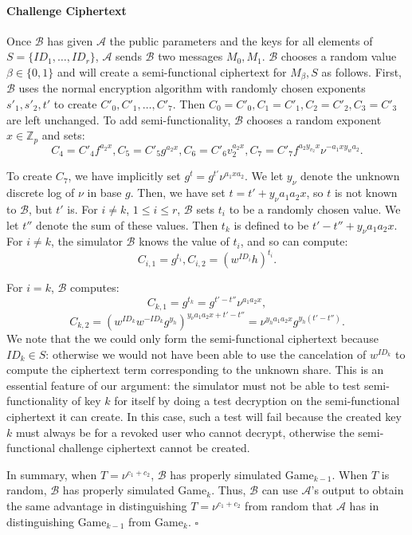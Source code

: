 \documentclass[a4paper, 11pt]{article}
\newenvironment{proof}{\par\noindent{\bf Proof.}}{$\square$\par\bigskip}
\newcommand{\Z}{\ensuremath{\mathbb{Z}}}
\theoremstyle{definition}
\begin{document}
\begin{proof}
\paragraph{Challenge Ciphertext} Once $\mathcal{B}$ has given $\mathcal{A}$ the public parameters and the keys for all elements of $S = \{ID_1, \ldots, ID_r\}$, $\mathcal{A}$ sends $\mathcal{B}$ two messages $M_0, M_1$. $\mathcal{B}$ chooses a random value $\beta \in \{0,1\}$ and will create a semi-functional ciphertext for $M_\beta, S$ as follows. First, $\mathcal{B}$ uses the normal encryption algorithm with randomly chosen exponents $s'_1, s'_2, t'$ to create $C'_0, C'_1, \ldots, C'_7$. Then $C_0 = C'_0, C_1 = C'_1, C_2 = C'_2, C_3 = C'_3$ are left unchanged. To add semi-functionality, $\mathcal{B}$ chooses a random exponent $x \in \Z_p$ and sets:
\[C_4 = C'_4 f^{a_2 x}, C_5 = C'_5 g^{a_2x}, C_6 = C'_6v_2^{a_2x}, C_7 = C'_7 f^{a_2 y_{v_2}x} \nu^{-a_1 x y_w a_2}.\]

To create $C_7$, we have implicitly set $g^{t} = g^{t'} \nu^{a_1 x a_2}$. We let $y_{\nu}$ denote the unknown discrete log of $\nu$ in base $g$. Then, we have set $t = t' + y_{\nu} a_1 a_2 x$, so $t$ is not known to $\mathcal{B}$, but $t'$ is. For $i\neq k$, $1\leq i \leq r$, $\mathcal{B}$ sets $t_i$ to be a randomly chosen value. We let $t''$ denote the sum of these values. Then $t_k$ is defined to be $t'-t'' + y_{\nu} a_1 a_2 x$. For $i\neq k$, the simulator $\mathcal{B}$ knows the value of $t_i$, and so can compute:
\[C_{i,1} = g^{t_i}, C_{i,2} = (w^{ID_i}h)^{t_i}.\]

For $i = k$, $\mathcal{B}$ computes:
\[C_{k,1} = g^{t_k} = g^{t'-t''} \nu^{a_1 a_2 x}, \]
\[C_{k,2}  = (w^{ID_k}w^{-ID_k}g^{y_h})^{y_\nu a_1 a_2 x + t' - t''} = \nu^{y_h a_1 a_2 x} g^{y_h(t' - t'')}.\]
We note that the we could only form the semi-functional ciphertext because $ID_k \in S$: otherwise we would not have been able to use the cancelation of $w^{ID_k}$ to compute the ciphertext term corresponding to the unknown share. This is an essential feature of our argument: the simulator must not be able to test semi-functionality of key $k$ for itself by doing a test decryption on the semi-functional ciphertext it can create. In this case, such a test will fail because the created key $k$ must always be for a revoked user who cannot decrypt, otherwise the semi-functional challenge ciphertext cannot be created.

In summary, when $T = \nu^{c_1+c_2}$, $\mathcal{B}$ has properly simulated Game$_{k-1}$. When $T$ is random, $\mathcal{B}$ has properly simulated Game$_k$. Thus, $\mathcal{B}$ can use $\mathcal{A}$'s output to obtain the same advantage in distinguishing $T = \nu^{c_1+c_2}$ from random that $\mathcal{A}$ has in distinguishing Game$_{k-1}$ from Game$_{k}$.
\end{proof}
\end{document}
